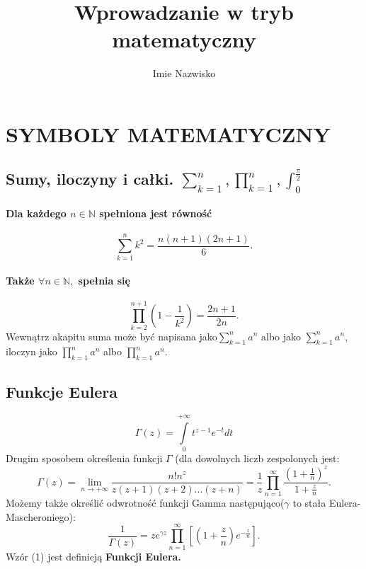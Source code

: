\documentclass[a4paper, 12pt]{amsart}
\author{Imie Nazwisko}
\title{Wprowadzanie w tryb matematyczny}
\begin{document}
\maketitle

\section{SYMBOLY MATEMATYCZNY}
\subsection{Sumy, iloczyny i całki. $ \sum_{k=1}^{n} , \prod_{k=1}^{n} , \int_{0}^{\frac{\pi}{2}} $} 
\paragraph{ Dla każdego $ n \in \mathbb{N}$ spełniona jest równość}
$$ \sum_{k=1}^{n} k^2 = \frac{n(n+1)(2n+1)}{6} .$$
\paragraph{Także $\forall n \in \mathbb{N},$ spełnia się}
$$ \prod_{k=2}^{n+1} \left(1-\frac{1}{k^2}\right)=\frac{2n+1}{2n}. $$
Wewnątrz akapitu suma może być napisana jako\(\sum_{k=1}^{n}a^n\) albo jako \({\sum\limits_{k=1}^{n}a^n}\), iloczyn jako 
\(\prod_{k=1}^{n} a^n \) albo \(\prod\limits_{k=1}^{n} a^n \).
\subsection{Funkcje Eulera}
\begin{equation} \Gamma(z)= \int\limits_{0}^{+\infty}t^{z-1}e^{-t}dt
\end{equation}
Drugim sposobem określenia funkcji $\Gamma$ (dla dowolnych liczb zespolonych jest:
\begin{equation} \Gamma(z)= \lim_{{n \to +\infty}} \frac{n!n^z}{z(z+1)(z+2)...(z+n)}=\frac{1}{z}\prod\limits_{n=1}^{\infty}
\frac{\left(1+\frac{1}{n}\right)^z}{1+\frac{z}{n}}.
\end{equation}
Możemy także określić odwrotność funkcji Gamma następująco($\gamma$ to stała Eulera-Mascheroniego):
\begin{equation} \frac{1}{\Gamma(z)}=ze^{\gamma z} \prod\limits_{n=1}^{\infty}\left[\left(1+
\frac{z}{n}\right)e^{-\frac{z}{n}}\right]. 
\end{equation}
Wzór (1) jest definicją \textbf{Funkcji Eulera.}
\end{document}

